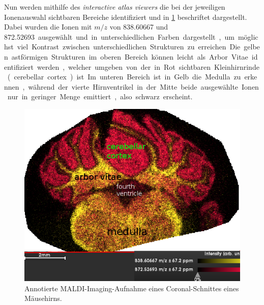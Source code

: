 Nun werden mithilfe des \emph{interactive atlas viewers} die bei der jeweiligen Ionenauswahl sichtbaren Bereiche identifiziert und in \cref{fig:hirn-ann} beschriftet dargestellt.
Dabei wurden die Ionen mit $m/z$ von \SI{838.60667}{} und \SI{872.52693} ausgewählt und in unterschiedlichen Farben dargestellt, um möglichst viel Kontrast zwischen unterschiedlichen Strukturen zu erreichen.

Die gelben astförmigen Strukturen im oberen Bereich können leicht als Arbor Vitae identifiziert werden, welcher umgeben von der in Rot sichtbaren Kleinhirnrinde (cerebellar cortex) ist.
Im unteren Bereich ist in Gelb die Medulla zu erkennen, während der  vierte Hirnventrikel in der Mitte beide ausgewählte Ionen nur in geringer Menge emittiert, also schwarz erscheint. %

\begin{figure}[!ht]
    \centering
    \includegraphics[width=1\textwidth]{raw/hirn/Hirn872-838_ann}
    \caption{Annotierte MALDI-Imaging-Aufnahme eines Coronal-Schnittes eines Mäusehirns.}
    \label{fig:hirn-ann}
\end{figure}

